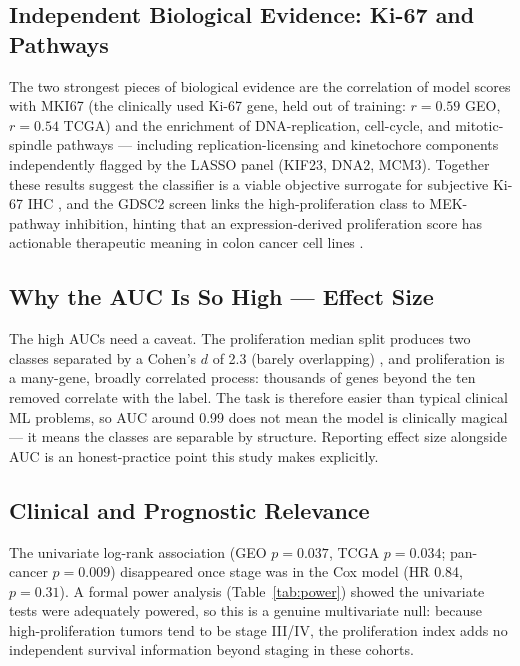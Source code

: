 \documentclass[11pt]{article}
\begin{document}
\subsection{Independent Biological Evidence: Ki-67 and Pathways}
The two strongest pieces of biological evidence are the correlation of model scores with MKI67 (the clinically used Ki-67 gene, held out of training: $r = 0.59$ GEO, $r = 0.54$ TCGA) and the enrichment of DNA-replication, cell-cycle, and mitotic-spindle pathways --- including replication-licensing and kinetochore components independently flagged by the LASSO panel (KIF23, DNA2, MCM3). Together these results suggest the classifier is a viable objective surrogate for subjective Ki-67 IHC \cite{zeng2025}, and the GDSC2 screen links the high-proliferation class to MEK-pathway inhibition, hinting that an expression-derived proliferation score has actionable therapeutic meaning in colon cancer cell lines \cite{iorio2016}.

\subsection{Why the AUC Is So High --- Effect Size}
The high AUCs need a caveat. The proliferation median split produces two classes separated by a Cohen's $d$ of 2.3 (barely overlapping) \cite{cohen1988}, and proliferation is a many-gene, broadly correlated process: thousands of genes beyond the ten removed correlate with the label. The task is therefore easier than typical clinical ML problems, so AUC around 0.99 does not mean the model is clinically magical --- it means the classes are separable by structure. Reporting effect size alongside AUC is an honest-practice point this study makes explicitly.

\subsection{Clinical and Prognostic Relevance}
The univariate log-rank association (GEO $p = 0.037$, TCGA $p = 0.034$; pan-cancer $p = 0.009$) disappeared once stage was in the Cox model (HR 0.84, $p = 0.31$). A formal power analysis (Table~\ref{tab:power}) showed the univariate tests were adequately powered, so this is a genuine multivariate null: because high-proliferation tumors tend to be stage III/IV, the proliferation index adds no independent survival information beyond staging in these cohorts.
\end{document}

